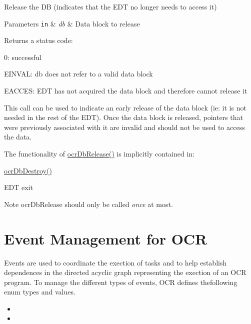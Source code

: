 Release the D\-B (indicates that the E\-D\-T no longer needs to access it)


\begin{DoxyParams}[1]{Parameters}
\mbox{\tt in}  & {\em db} & Data block to release\\
\hline
\end{DoxyParams}
\begin{DoxyReturn}{Returns}
a status code\-:
\begin{DoxyItemize}
\item 0\-: successful
\item E\-I\-N\-V\-A\-L\-: db does not refer to a valid data block
\item E\-A\-C\-C\-E\-S\-: E\-D\-T has not acquired the data block and therefore cannot release it
\end{DoxyItemize}
\end{DoxyReturn}

\descr
This call can be used to indicate an early release of the data block (ie\-: it is not needed in the rest of the E\-D\-T). Once the data block is released, pointers that were previously associated with it are invalid and should not be used to access the data.

The functionality of \hyperlink{group__OCRDataBlock_ga2ec03c0b0998bdaf9ccc44a06fb05ca0}{ocr\-Db\-Release()} is implicitly contained in\-:
\begin{DoxyItemize}
\item \hyperlink{group__OCRDataBlock_gabc80ea5594e5e55a541a1df4c7727821}{ocr\-Db\-Destroy()}
\item E\-D\-T exit
\end{DoxyItemize}

\begin{DoxyNote}{Note}
ocr\-Db\-Release should only be called {\itshape once} at most.
\end{DoxyNote}

\section{Event Management for OCR}
\label{sec:OCReventManagement}

Events are  used to coordinate the exection of tasks and to
help establish dependences in the directed acyclic graph representing the exection of an OCR program.
To manage the different types of events, OCR defines thefollowing enum types and values.
\begin{itemize}
\item {}

\item {}

\end{itemize}

